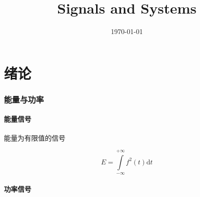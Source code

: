 \documentclass{article}
\title{Signals and Systems}
\author{}
\date{\today}
\begin{document}
\hypersetup{
    hidelinks,
    allcolors = black,
    breaklinks = true
}

\newtheorem{definition}{Definition}[subsection]
\newtheorem{theorem}{Theorem}[subsection]
\newtheorem{corollary}{Corollary}[theorem]
\renewcommand{\proofname}{\indent\bf Proof}

\def\e{\mathrm e}
\def\i{\mathrm i}
\def\j{\mathrm j}
\def\d{\mathrm d}
\def\C{\mathrm C}
\def\div{\mathrm{div}}
\def\rot{\mathrm{rot}}
\def\vecv{\vec{\mathrm v}}
\def\sr{\mathbb R}
\def\srp{\mathbb R^+}
\def\sn{\mathbb N}
\def\snp{\mathbb N^+}
\def\sc{\mathbb C}
\def\sz{\mathbb Z}
\edef\impint{\int\limits_{-\infty}^{+\infty}}
\def\sumsz{\sum_{n\in\sz}}

\newcommand{\abs}[1]{\left|#1\right|}
\newcommand{\pare}[1]{\left(#1\right)}
\newcommand{\fourier}[1]{\mathscr F\pare{#1}}
\newcommand{\ifourier}[1]{\mathscr F^{-1}\pare{#1}}
\newcommand{\laplace}[1]{\mathscr L\pare{#1}}
\newcommand{\ilaplace}[1]{\mathscr L^{-1}\pare{#1}}
\newcommand{\jacobi}[2]{\frac{\partial\pare{#1}}{\partial\pare{#2}}}

\def\ft{f\pare{t}}
\def\fw{F\pare{\omega}}
\def\fs{F\pare{s}}


\begin{titlepage}
    \maketitle
\end{titlepage}

\tableofcontents
\newpage

\part{绪论}

\section{能量与功率}

\subsection{能量信号}

能量为有限值的信号

\[E=\impint f^2\pare{t}\d t\]

\subsection{功率信号}
\end{document}
